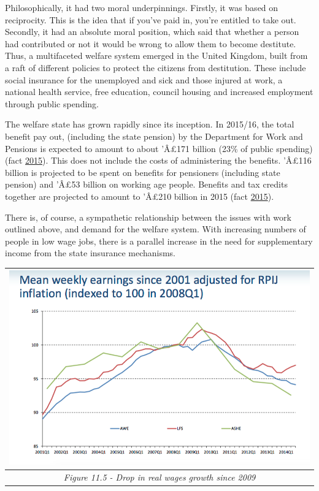 \documentclass[]{tufte-handout}
\begin{document}
Philosophically, it had two moral underpinnings. Firstly, it was based
on reciprocity. This is the idea that if you've paid in, you're entitled
to take out. Secondly, it had an absolute moral position, which said
that whether a person had contributed or not it would be wrong to allow
them to become destitute. Thus, a multifaceted welfare system emerged in
the United Kingdom, built from a raft of different policies to protect
the citizens from destitution. These include social insurance for the
unemployed and sick and those injured at work, a national health
service, free education, council housing and increased employment
through public spending.

The welfare state has grown rapidly since its inception. In 2015/16, the
total benefit pay out, (including the state pension) by the Department
for Work and Pensions is expected to amount to about 'Â£171 billion
(23\% of public spending) (fact
\protect\hyperlink{ref-Fullfact2015}{2015}). This does not include the
costs of administering the benefits. 'Â£116 billion is projected to be
spent on benefits for pensioners (including state pension) and 'Â£53
billion on working age people. Benefits and tax credits together are
projected to amount to 'Â£210 billion in 2015 (fact
\protect\hyperlink{ref-Fullfact2015}{2015}).

There is, of course, a sympathetic relationship between the issues with
work outlined above, and demand for the welfare system. With increasing
numbers of people in low wage jobs, there is a parallel increase in the
need for supplementary income from the state insurance mechanisms.

\begin{longtable}[]{@{}c@{}}
\toprule
\includegraphics{ChapterPictures/11-5-RealWages2009.png}\tabularnewline
\midrule
\endhead
\emph{Figure 11.5 - Drop in real wages growth since 2009}\tabularnewline
\bottomrule
\end{longtable}
\end{document}
